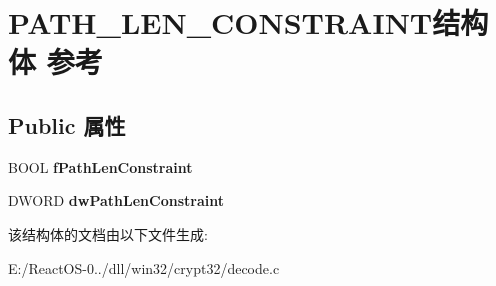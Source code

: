 \hypertarget{struct_p_a_t_h___l_e_n___c_o_n_s_t_r_a_i_n_t}{}\section{P\+A\+T\+H\+\_\+\+L\+E\+N\+\_\+\+C\+O\+N\+S\+T\+R\+A\+I\+N\+T结构体 参考}
\label{struct_p_a_t_h___l_e_n___c_o_n_s_t_r_a_i_n_t}
\subsection*{Public 属性}
\begin{DoxyCompactItemize}
\item 
\mbox{\label{struct_p_a_t_h___l_e_n___c_o_n_s_t_r_a_i_n_t_ad09dc17d0d6ff1279533c8fad36dbdd3}} 
B\+O\+OL {\bfseries f\+Path\+Len\+Constraint}
\item 
\mbox{\label{struct_p_a_t_h___l_e_n___c_o_n_s_t_r_a_i_n_t_a66f3a44b2491d5cdd774a3f39c2e3945}} 
D\+W\+O\+RD {\bfseries dw\+Path\+Len\+Constraint}
\end{DoxyCompactItemize}


该结构体的文档由以下文件生成\+:\begin{DoxyCompactItemize}
\item 
E\+:/\+React\+O\+S-\/0../dll/win32/crypt32/decode.\+c\end{DoxyCompactItemize}
